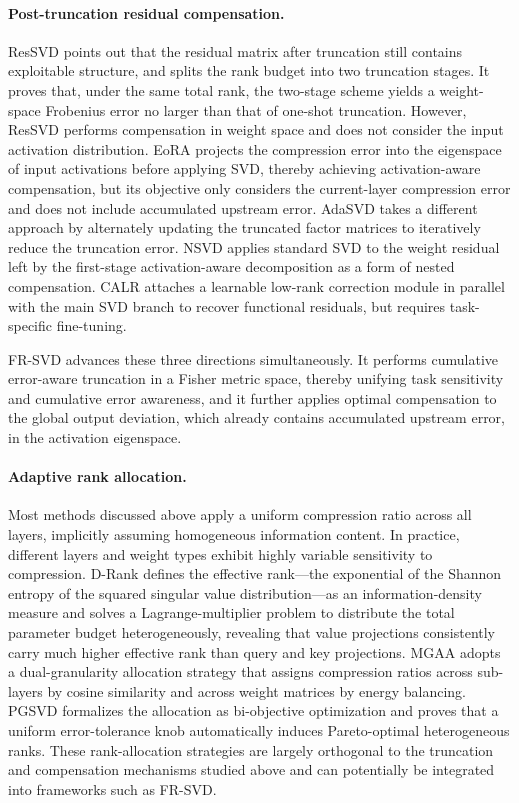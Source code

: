 \documentclass[a4paper,fleqn]{cas-dc}
\begin{document}
\paragraph{Post-truncation residual compensation.}
ResSVD \citep{bai2025ressvd} points out that the residual matrix after truncation still contains exploitable structure, and splits the rank budget into two truncation stages. It proves that, under the same total rank, the two-stage scheme yields a weight-space Frobenius error no larger than that of one-shot truncation. However, ResSVD performs compensation in weight space and does not consider the input activation distribution. EoRA \citep{liu2025eora} projects the compression error into the eigenspace of input activations before applying SVD, thereby achieving activation-aware compensation, but its objective only considers the current-layer compression error and does not include accumulated upstream error. AdaSVD \citep{li2025adasvd} takes a different approach by alternately updating the truncated factor matrices to iteratively reduce the truncation error. NSVD \citep{lu2025nsvd} applies standard SVD to the weight residual left by the first-stage activation-aware decomposition as a form of nested compensation. CALR \citep{kautsar2025calr} attaches a learnable low-rank correction module in parallel with the main SVD branch to recover functional residuals, but requires task-specific fine-tuning.

FR-SVD advances these three directions simultaneously. It performs cumulative error-aware truncation in a Fisher metric space, thereby unifying task sensitivity and cumulative error awareness, and it further applies optimal compensation to the global output deviation, which already contains accumulated upstream error, in the activation eigenspace.

\paragraph{Adaptive rank allocation.}
Most methods discussed above apply a uniform compression ratio across all layers, implicitly assuming homogeneous information content. In practice, different layers and weight types exhibit highly variable sensitivity to compression. D-Rank \citep{mi2025drank} defines the effective rank---the exponential of the Shannon entropy of the squared singular value distribution---as an information-density measure and solves a Lagrange-multiplier problem to distribute the total parameter budget heterogeneously, revealing that value projections consistently carry much higher effective rank than query and key projections. MGAA \citep{li2025mgaa} adopts a dual-granularity allocation strategy that assigns compression ratios across sub-layers by cosine similarity and across weight matrices by energy balancing. PGSVD \citep{solgi2025pgsvd} formalizes the allocation as bi-objective optimization and proves that a uniform error-tolerance knob automatically induces Pareto-optimal heterogeneous ranks. These rank-allocation strategies are largely orthogonal to the truncation and compensation mechanisms studied above and can potentially be integrated into frameworks such as FR-SVD.
\end{document}
